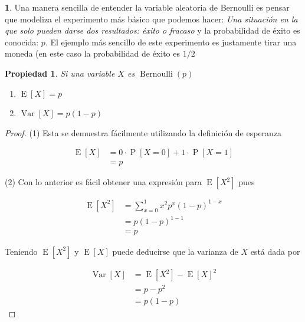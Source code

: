 \documentclass[]{book}
\theoremstyle{plain}
\newtheorem{property}[theorem]{Propiedad}
\theoremstyle{definition}
\theoremstyle{definition} %
\newcommand{\thistheoremname}{}
\newtheorem{genericthm}[theorem]{\thistheoremname}
\newenvironment{customdef}[1]
  {\renewcommand{\thistheoremname}{#1}%
   \begin{genericthm}}
  {\end{genericthm}}
\begin{document}
\begin{customdef}{Experimento de Bernoulli}
  Una manera sencilla de entender la variable aleatoria de Bernoulli es pensar que modeliza el experimento más básico que 
  podemos hacer: \emph{Una situación en la que solo pueden darse dos resultados: éxito o fracaso} y la probabilidad de éxito es 
  conocida: $p$. El ejemplo más sencillo de este experimento es justamente tirar una moneda (en este caso la probabilidad de éxito es $1/2$
\end{customdef} 

\begin{property} Si una variable $X$ es  $\operatorname {Bernoulli} (p)$
 \begin{enumerate} [(1)]
   \item $\operatorname {E} \left[X\right]=p$
   \item  $\operatorname {Var} \left[X\right]=p(1-p)$
 \end{enumerate}
  
\end{property}

\begin{proof}
(1) Esta se demuestra fácilmente utilizando la definición de esperanza

\[\displaystyle {\begin{aligned}\operatorname {E} [X]&=0\cdot \operatorname {P} [X=0]+1\cdot \operatorname {P} [X=1]\\&=p\end{aligned}}\]

(2) Con lo anterior es fácil obtener una expresión para
\(\displaystyle \operatorname {E} [X^{2}]\) pues

\[\displaystyle {\begin{aligned}\operatorname {E} [X^{2}]&=\sum _{x=0}^{1}x^{2}p^{x}(1-p)^{1-x}\\&=p(1-p)^{1-1}\\&=p\end{aligned}}\]
 
Teniendo \(\displaystyle \operatorname {E} [X^{2}]\) y
\(\displaystyle \operatorname {E} [X]\) puede deducirse que la varianza
de \(X\) está dada por

\[\displaystyle {\begin{aligned}\operatorname {Var} \left[X\right]&=\operatorname {E} [X^{2}]-\operatorname {E} [X]^{2}\\&=p-p^{2}\\&=p\left(1-p\right)\end{aligned}}\]

\end{proof}
\end{document}
